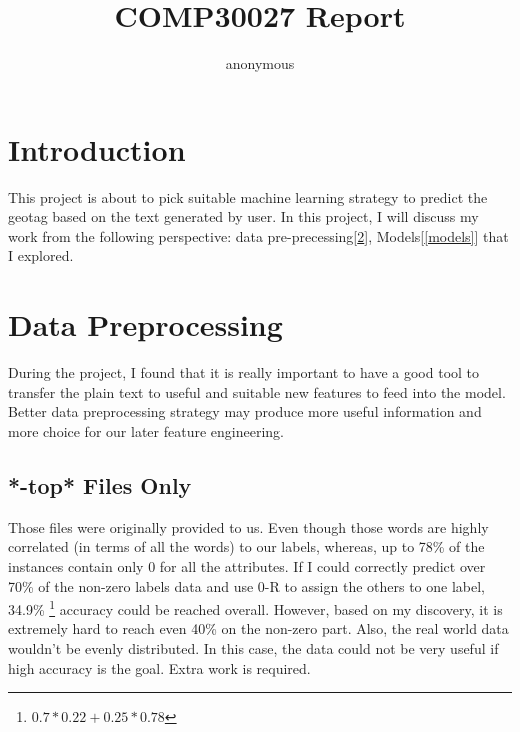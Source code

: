 \documentclass[11pt]{article}
\author{anonymous}
\title{COMP30027 Report}
\begin{document}
\maketitle

\section{Introduction}
This project is about to pick suitable machine learning strategy to
predict the geotag based on the text generated by user. In this
project, I will discuss my work from the following perspective:
data pre-precessing[\ref{sec2}], Models[\ref{models}] that I explored.

\section{Data Preprocessing}
\label{sec2}
During the project, I found that it
is really important to have a good tool to transfer the plain text
to useful and suitable new features to feed into the model.
Better data preprocessing strategy may produce more useful information 
and more choice for our later feature engineering.

\subsection{*-top* Files Only}
Those files were originally provided to us. Even though those words
are highly correlated (in terms of all the words) to our labels, 
whereas, up to 78\% of the
instances contain only 0 for all the attributes. If I could 
correctly predict over 70\% of the non-zero labels data and use 
0-R to assign the others to one label, 34.9\%
\footnote{$0.7*0.22+0.25*0.78$} accuracy could be 
reached overall. However, based on my discovery, it is extremely
hard to reach even 40\% on the non-zero part. Also, the real world
data wouldn't be evenly distributed. In this case, the 
data could not be very useful if high accuracy is the goal. 
Extra work is required.
\end{document}
